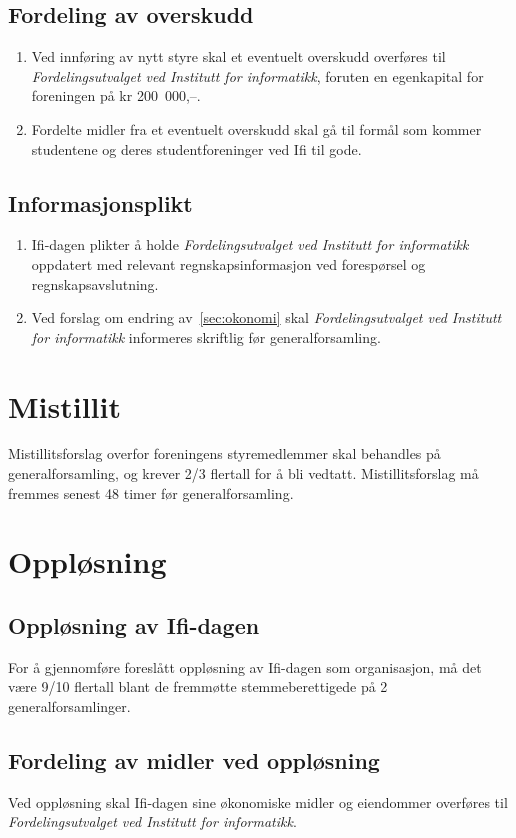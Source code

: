 \documentclass[norsk,a4paper]{article}
\begin{document}
\subsection{Fordeling av overskudd}
\begin{enumerate}
	\item Ved innføring av nytt styre skal et eventuelt overskudd overføres til \textit{Fordelingsutvalget ved Institutt for informatikk}, foruten en egenkapital for foreningen på kr 200~000,--. 
	\item Fordelte midler fra et eventuelt overskudd skal gå til formål som kommer studentene og deres studentforeninger ved Ifi til gode.
\end{enumerate}

\subsection{Informasjonsplikt}
\begin{enumerate}
	\item Ifi-dagen plikter å holde \textit{Fordelingsutvalget ved Institutt for informatikk} oppdatert med relevant regnskapsinformasjon ved forespørsel og regnskapsavslutning.
	\item Ved forslag om endring av~\ref{sec:okonomi} skal \textit{Fordelingsutvalget ved Institutt for informatikk} informeres skriftlig før generalforsamling.
\end{enumerate}

\section{Mistillit}
Mistillitsforslag overfor foreningens styremedlemmer skal behandles på generalforsamling, og krever 2/3 flertall for å bli vedtatt. Mistillitsforslag må fremmes senest 48 timer før generalforsamling.

\section{Oppløsning}
\subsection{Oppløsning av Ifi-dagen}
For å gjennomføre foreslått oppløsning av Ifi-dagen som organisasjon, må det være 9/10 flertall
blant de fremmøtte stemmeberettigede på 2 generalforsamlinger.

\subsection{Fordeling av midler ved oppløsning}
Ved oppløsning skal Ifi-dagen sine økonomiske midler og eiendommer overføres til
\textit{Fordelingsutvalget ved Institutt for informatikk}.\label{ref:lastpage}
\end{document}
